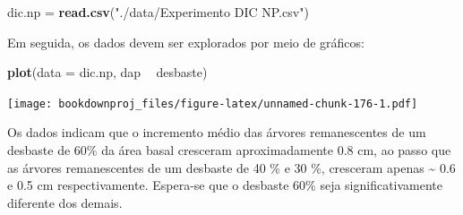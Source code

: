 \documentclass[
]{article}
\newenvironment{Shaded}{\begin{snugshade}}{\end{snugshade}}
\newcommand{\DataTypeTok}[1]{\textcolor[rgb]{0.13,0.29,0.53}{#1}}
\newcommand{\KeywordTok}[1]{\textcolor[rgb]{0.13,0.29,0.53}{\textbf{#1}}}
\newcommand{\NormalTok}[1]{#1}
\newcommand{\OperatorTok}[1]{\textcolor[rgb]{0.81,0.36,0.00}{\textbf{#1}}}
\newcommand{\OtherTok}[1]{\textcolor[rgb]{0.56,0.35,0.01}{#1}}
\newcommand{\StringTok}[1]{\textcolor[rgb]{0.31,0.60,0.02}{#1}}
\begin{document}
\begin{Shaded}
\begin{Highlighting}[]
\NormalTok{dic.np =}\StringTok{ }\KeywordTok{read.csv}\NormalTok{(}\StringTok{"./data/Experimento DIC NP.csv"}\NormalTok{)}
\end{Highlighting}
\end{Shaded}

Em seguida, os dados devem ser explorados por meio de gráficos:

\begin{Shaded}
\begin{Highlighting}[]
\KeywordTok{plot}\NormalTok{(}\DataTypeTok{data =}\NormalTok{ dic.np, dap }\OperatorTok{~}\StringTok{ }\NormalTok{desbaste)}
\end{Highlighting}
\end{Shaded}

\texttt{[image: bookdownproj\_files/figure-latex/unnamed-chunk-176-1.pdf]}

Os dados indicam que o incremento médio das árvores remanescentes de um desbaste de 60\% da área basal cresceram aproximadamente 0.8 cm, ao passo que as árvores remanescentes de um desbaste de 40 \% e 30 \%, cresceram apenas \textasciitilde{} 0.6 e 0.5 cm respectivamente. Espera-se que o desbaste 60\% seja significativamente diferente dos demais.

\begin{Shaded}
\end{Shaded}
\end{document}
